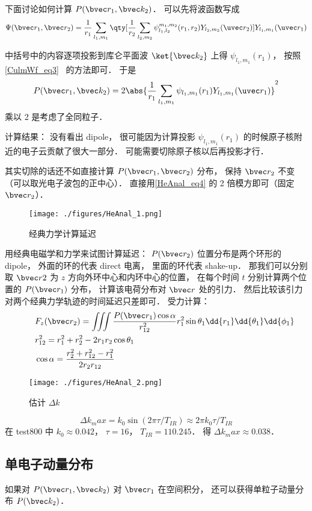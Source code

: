 下面讨论如何计算 $P(\bvec r_1, \bvec k_2)$． 可以先将波函数写成
\begin{equation}\label{HeAnal_eq4}
\Psi(\bvec r_1, \bvec r_2) = \frac{1}{r_1}\sum_{l_1,m_1} \qty[\frac{1}{r_2}\sum_{l_2,m_2} \psi_{l_1,l_2}^{m_1,m_2}(r_1, r_2) Y_{l_2,m_2}(\uvec r_2)] Y_{l_1,m_1}(\uvec r_1)
\end{equation}

中括号中的内容逐项投影到库仑平面波 $\ket{\bvec k_2}$ 上得 $\psi_{l_1,m_1}(r_1)$， 按照\autoref{CulmWf_eq3}~ 的方法即可． 于是
\begin{equation}\label{HeAnal_eq1}
P(\bvec r_1, \bvec k_2) = 2\abs{\frac{1}{r_1}\sum_{l_1,m_1} \psi_{l_1,m_1}(r_1) Y_{l_1,m_1}(\uvec r_1)}^2
\end{equation}
乘以 2 是考虑了全同粒子．

计算结果： 没有看出 dipole， 很可能因为计算投影 $\psi_{l_1,m_1}(r_1)$ 的时候原子核附近的电子云贡献了很大一部分． 可能需要切除原子核以后再投影才行．

其实切除的话还不如直接计算 $P(\bvec r_1, \bvec r_2)$ 分布， 保持 $\bvec r_2$ 不变（可以取光电子波包的正中心）． 直接用\autoref{HeAnal_eq4} 的 2 倍模方即可（固定 $\bvec r_2$）．

\begin{figure}[ht]
\centering
\texttt{[image: ./figures/HeAnal\_1.png]}
\caption{经典力学计算延迟} \label{HeAnal_fig1}
\end{figure}

用经典电磁学和力学来试图计算延迟： $P(\bvec r_2)$ 位置分布是两个环形的 dipole， 外面的环的代表 direct 电离， 里面的环代表 shake-up． 那我们可以分别取 $\bvec r2$ 为 $z$ 方向外环中心和内环中心的位置， 在每个时间 $t$ 分别计算两个位置的 $P(\bvec r_1)$ 分布， 计算该电荷分布对 $\bvec r$ 处的引力． 然后比较该引力对两个经典力学轨迹的时间延迟只差即可． 受力计算：
\begin{equation}
\begin{aligned}
&F_z(\bvec r_2) = \iiint \frac{P(\bvec r_1) \cos\alpha}{r_{12}^2} r_1^2\sin\theta_1 \dd{r_1}\dd{\theta_1}\dd{\phi_1}\\
\qquad
&r_{12}^2 = r_1^2 + r_2^2 - 2r_1r_2 \cos\theta_1\\
&\cos\alpha = \frac{r_2^2 + r_{12}^2 - r_1^2}{2r_2 r_{12}}
\end{aligned}
\end{equation}

\begin{figure}[ht]
\centering
\texttt{[image: ./figures/HeAnal\_2.png]}
\caption{估计 $\Delta k$} \label{HeAnal_fig2}
\end{figure}
\begin{equation}
\Delta k_max = k_0 \sin(2\pi \tau/T_{IR}) \approx 2 \pi k_0  \tau/T_{IR}
\end{equation}
在 test800 中 $k_0 \approx 0.042$， $\tau = 16$， $T_{IR} = 110.245$． 得 $\Delta k_max \approx 0.038$．

\subsection{单电子动量分布}
如果对 $P(\bvec r_1, \bvec k_2)$ 对 $\bvec r_1$ 在空间积分， 还可以获得单粒子动量分布 $P(\bvec k_2)$．
